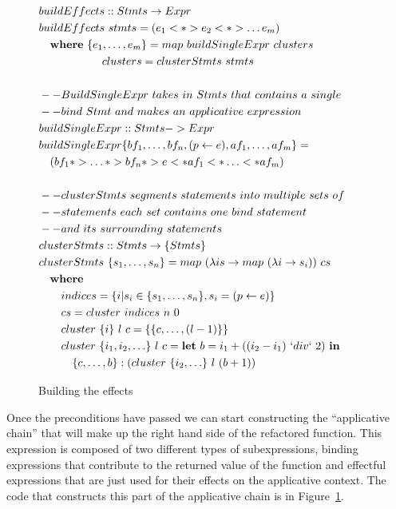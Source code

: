 \DIFaddend \begin{figure}[t]
\begin{math}
\begin{aligned}
&buildEffects :: Stmts \rightarrow Expr&\\
&buildEffects\ stmts = (e_1 <*> e_2 <*> \ldots e_m)\\
&\quad \textbf{where}\ \{e_1, \ldots, e_m \} = map\ buildSingleExpr\ clusters\\
&\qquad \quad \quad \quad\ \ clusters = clusterStmts\ stmts\\
\\
&--BuildSingleExpr\ takes\ in\ Stmts\ that\ contains\ a\ single\\
&--bind\ Stmt\ and\ makes\ an\ applicative\ expression\\
&buildSingleExpr :: Stmts -> Expr\\
&buildSingleExpr \{bf_1, \ldots, bf_n, (p \leftarrow e), af_1, \ldots, af_m\} = \\
&\quad(bf_1 *> \ldots *> bf_n *> e <* af_1 <* \ldots <* af_m)\\
\\
&--clusterStmts\ segments\ statements\ into\ multiple\ sets\ of\\
&--statements\ each\ set\ contains\ one\ bind\ statement\\
&--and\ its\ surrounding\ statements\\
&clusterStmts :: Stmts \rightarrow \{Stmts\}\\
&clusterStmts\ \{s_1, \ldots, s_n \} = map\ (\lambda is \rightarrow map\ (\lambda i \rightarrow s_i))\ cs\\
&\quad \textbf{where}\\
&\qquad indices = \{i | s_i \in \{s_1, \ldots, s_n\}, s_i = (p \leftarrow e)\}\\
&\qquad cs = cluster\ indices\ n\ 0\\
&\qquad cluster\ \{i\}\ l\ c = \{\{c, \ldots, (l-1)\}\}\\
&\qquad cluster\ \{i_1,i_2,\ldots \}\ l\ c = \textbf{let}\ b = i_1 + ((i_2-i_1)\ `div`\ 2)\ \textbf{in}\\
&\qquad \quad \{c, \ldots, b\}:(cluster\ \{i_2, \ldots \}\ l\ (b+1))
\end{aligned}
\end{math}
\caption{Building the effects}
\label{effects}
\end{figure}


Once the preconditions have passed we can start constructing the ``applicative chain'' that will make up the right hand side of the refactored function. This expression is composed of two different types of subexpressions, binding expressions that contribute to the returned value of the function and effectful expressions that are just used for their effects on the applicative context. The code that constructs this \DIFdelbegin {}\DIFdelend \DIFaddbegin {}\DIFaddend part of the applicative chain is \DIFdelbegin {}\DIFdelend \DIFaddbegin {}\DIFaddend in Figure~\ref{effects}.

